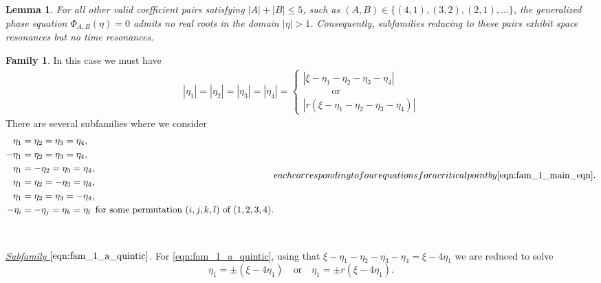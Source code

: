 \documentclass[reqno,english,11pt]{amsart}
\newtheorem{lemma}[theorem]{Lemma}
\theoremstyle{definition}
\numberwithin{equation}{section}
\begin{document}
\begin{lemma}\label{lem:no_roots}
    For all other valid coefficient pairs satisfying $|A| + |B| \le 5$, such as $(A,B) \in \{(4,1), (3,2), (2,1), \dots\}$, the generalized phase equation $\Phi_{A,B}(\eta) = 0$ admits no real roots in the domain $|\eta| > 1$. Consequently, subfamilies reducing to these pairs exhibit space resonances but no time resonances.
\end{lemma}


\noindent
\textbf{Family 1}.
\noindent
 In this case we must have 
 \begin{align}
 |\eta_{1}|=|\eta_{2}|=|\eta_{3}|=|\eta_{4}| =\begin{cases} 
  |\xi-\eta_{1}-\eta_{2}-\eta_{3}-\eta_{4}| 
  \\
   \quad\quad\quad \text{or}
 \\
\left|r\left(\xi-\eta_{1}-\eta_{2}-\eta_{3}-\eta_{4}\right)\right|
 \end{cases}
 \label{eqn:fam_1_main_eqn}
 \end{align}
There are several subfamilies where we consider
\begin{subequations}
\label{eqn:fam_1_subfam_quintic}
\begin{align}
\eta_1 &= \eta_2 = \eta_3 = \eta_4, \label{eqn:fam_1_a_quintic} \\
-\eta_1 &= \eta_2 = \eta_3 = \eta_4, \label{eqn:fam_1_b_quintic} \\
\eta_1 &= -\eta_2 = \eta_3 = \eta_4, \label{eqn:fam_1_c_quintic} \\
\eta_1 &= \eta_2 = -\eta_3 = \eta_4, \label{eqn:fam_1_d_quintic} \\
\eta_1 &= \eta_2 = \eta_3 = -\eta_4 ,
\label{eqn:fam_1_e_quintic}\\
-\eta_i &= -\eta_j = \eta_k = \eta_l \,\text{ for some permutation }(i,j,k,l) \text{ of }(1,2,3,4).\label{eqn:fam_1_f_quintic}
\end{align}
each corresponding to four equations for a critical point by \eqref{eqn:fam_1_main_eqn}.
\end{subequations}
\\\\
\noindent
{\it \underline{Subfamily $\eqref{eqn:fam_1_a_quintic}$}}.
For \eqref{eqn:fam_1_a_quintic}, using that $\xi-\eta_1-\eta_2-\eta_3-\eta_4=\xi-4\eta_1$ we are reduced to solve
\begin{equation}\label{eq:eta1_reduced}
\eta_1 = \pm(\xi-4\eta_1)
\quad\text{or}\quad
\eta_1 = \pm r(\xi-4\eta_1).
\end{equation}
\end{document}
